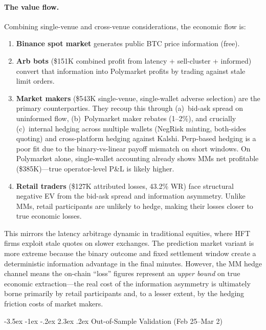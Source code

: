 \documentclass[11pt,a4paper]{article}
\makeatletter
\renewcommand\section{\@startsection{section}{1}{\z@}%
  {-3.5ex \@plus -1ex \@minus -.2ex}%
  {2.3ex \@plus .2ex}%
  {\normalfont\Large\bfseries}}
\makeatother
\begin{document}
\paragraph{The value flow.} Combining single-venue and cross-venue considerations, the economic flow is:
\begin{enumerate}[nosep]
    \item \textbf{Binance spot market} generates public BTC price information (free).
    \item \textbf{Arb bots} (\$151K combined profit from latency + sell-cluster + informed) convert that information into Polymarket profits by trading against stale limit orders.
    \item \textbf{Market makers} (\$543K single-venue, single-wallet adverse selection) are the primary counterparties. They recoup this through (a)~bid-ask spread on uninformed flow, (b)~Polymarket maker rebates (1--2\%), and crucially (c)~internal hedging across multiple wallets (NegRisk minting, both-sides quoting) and cross-platform hedging against Kalshi. Perp-based hedging is a poor fit due to the binary-vs-linear payoff mismatch on short windows. On Polymarket alone, single-wallet accounting already shows MMs net profitable (\$385K)---true operator-level P\&L is likely higher.
    \item \textbf{Retail traders} (\$127K attributed losses, 43.2\% WR) face structural negative EV from the bid-ask spread and information asymmetry. Unlike MMs, retail participants are unlikely to hedge, making their losses closer to true economic losses.
\end{enumerate}
This mirrors the latency arbitrage dynamic in traditional equities, where HFT firms exploit stale quotes on slower exchanges. The prediction market variant is more extreme because the binary outcome and fixed settlement window create a deterministic information advantage in the final minutes. However, the MM hedge channel means the on-chain ``loss'' figures represent an \textit{upper bound} on true economic extraction---the real cost of the information asymmetry is ultimately borne primarily by retail participants and, to a lesser extent, by the hedging friction costs of market makers.

\newpage
\section{Out-of-Sample Validation (Feb 25--Mar 2)}
\end{document}
